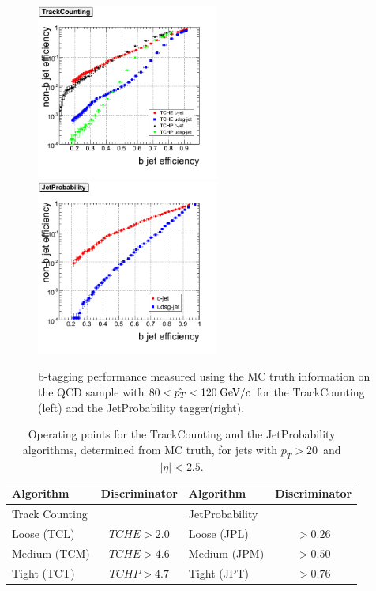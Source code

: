 \begin{figure}[htbp]
  \begin{center}
    \includegraphics[width=60mm]{Figures/Performance_plot_TC.png}
    \includegraphics[width=60mm]{Figures/Performance_plot_TP.png}
  \end{center}
  \caption{b-tagging performance measured using the MC truth information 
on the QCD sample with $80<\hat{p_T}<120\;{\rm GeV}/c$ for the TrackCounting 
(left) and the JetProbability tagger(right).}
  \label{fig:Performance_plots}
\end{figure}

\begin{table} [th]
\begin{center}
\begin{tabular}{|l|c|l|c|} 
\hline
Algorithm         & Discriminator & Algorithm      & Discriminator\\ \hline
Track Counting    &               & JetProbability &              \\
Loose  (TCL)      &  $TCHE>2.0$   & Loose  (JPL)   &  $>0.26$\\ 
Medium (TCM)      &  $TCHE>4.6$   & Medium (JPM)   &  $>0.50$\\ 
Tight  (TCT)      &  $TCHP>4.7$   & Tight  (JPT)   &  $>0.76$\\ 
\hline
\end{tabular}
\caption{\label{tab:OperatingPoints} 
 Operating points for the TrackCounting and the JetProbability algorithms,
 determined  from MC truth, for jets with $p_T>20$~\gevc and $|\eta|<2.5$.}
 \end{center}
\end{table}
